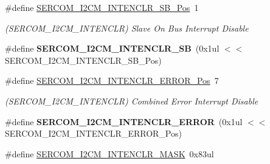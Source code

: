 \begin{DoxyCompactItemize}
\item 
\hypertarget{group___s_a_m_l21___s_e_r_c_o_m_gaebb4fa09f925b6e6e7d1d9ca8c9ff38f}{}\#define \hyperlink{group___s_a_m_l21___s_e_r_c_o_m_gaebb4fa09f925b6e6e7d1d9ca8c9ff38f}{S\+E\+R\+C\+O\+M\+\_\+\+I2\+C\+M\+\_\+\+I\+N\+T\+E\+N\+C\+L\+R\+\_\+\+S\+B\+\_\+\+Pos}~1\label{group___s_a_m_l21___s_e_r_c_o_m_gaebb4fa09f925b6e6e7d1d9ca8c9ff38f}

\begin{DoxyCompactList}\small\item\em (S\+E\+R\+C\+O\+M\+\_\+\+I2\+C\+M\+\_\+\+I\+N\+T\+E\+N\+C\+L\+R) Slave On Bus Interrupt Disable \end{DoxyCompactList}\item 
\hypertarget{group___s_a_m_l21___s_e_r_c_o_m_gac95c28f730d40bdcc41ec98d95d57feb}{}\#define {\bfseries S\+E\+R\+C\+O\+M\+\_\+\+I2\+C\+M\+\_\+\+I\+N\+T\+E\+N\+C\+L\+R\+\_\+\+S\+B}~(0x1ul $<$$<$ S\+E\+R\+C\+O\+M\+\_\+\+I2\+C\+M\+\_\+\+I\+N\+T\+E\+N\+C\+L\+R\+\_\+\+S\+B\+\_\+\+Pos)\label{group___s_a_m_l21___s_e_r_c_o_m_gac95c28f730d40bdcc41ec98d95d57feb}

\item 
\hypertarget{group___s_a_m_l21___s_e_r_c_o_m_gab5418c08d73f080d3b929529139f1bca}{}\#define \hyperlink{group___s_a_m_l21___s_e_r_c_o_m_gab5418c08d73f080d3b929529139f1bca}{S\+E\+R\+C\+O\+M\+\_\+\+I2\+C\+M\+\_\+\+I\+N\+T\+E\+N\+C\+L\+R\+\_\+\+E\+R\+R\+O\+R\+\_\+\+Pos}~7\label{group___s_a_m_l21___s_e_r_c_o_m_gab5418c08d73f080d3b929529139f1bca}

\begin{DoxyCompactList}\small\item\em (S\+E\+R\+C\+O\+M\+\_\+\+I2\+C\+M\+\_\+\+I\+N\+T\+E\+N\+C\+L\+R) Combined Error Interrupt Disable \end{DoxyCompactList}\item 
\hypertarget{group___s_a_m_l21___s_e_r_c_o_m_ga6da932414282c8e88364a7d98eeb34be}{}\#define {\bfseries S\+E\+R\+C\+O\+M\+\_\+\+I2\+C\+M\+\_\+\+I\+N\+T\+E\+N\+C\+L\+R\+\_\+\+E\+R\+R\+O\+R}~(0x1ul $<$$<$ S\+E\+R\+C\+O\+M\+\_\+\+I2\+C\+M\+\_\+\+I\+N\+T\+E\+N\+C\+L\+R\+\_\+\+E\+R\+R\+O\+R\+\_\+\+Pos)\label{group___s_a_m_l21___s_e_r_c_o_m_ga6da932414282c8e88364a7d98eeb34be}

\item 
\hypertarget{group___s_a_m_l21___s_e_r_c_o_m_ga64bc8103105ba11779a0370eea2d61ea}{}\#define \hyperlink{group___s_a_m_l21___s_e_r_c_o_m_ga64bc8103105ba11779a0370eea2d61ea}{S\+E\+R\+C\+O\+M\+\_\+\+I2\+C\+M\+\_\+\+I\+N\+T\+E\+N\+C\+L\+R\+\_\+\+M\+A\+S\+K}~0x83ul\label{group___s_a_m_l21___s_e_r_c_o_m_ga64bc8103105ba11779a0370eea2d61ea}


\end{DoxyCompactItemize}
